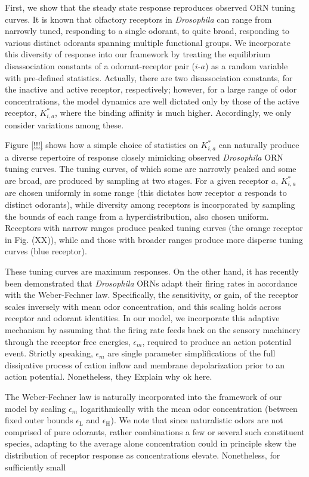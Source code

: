First, we show that the steady state response reproduces observed ORN tuning curves. It is known that olfactory receptors in \textit{Drosophila} can range from narrowly tuned, responding to a single odorant, to quite broad, responding to various distinct odorants spanning multiple functional groups. We incorporate this diversity of response into our framework by treating the equilibrium disassociation constants of a odorant-receptor pair ($i$-$a$) as a random variable with pre-defined statistics. Actually, there are two disassociation constants, for the inactive and active receptor, respectively; however, for a large range of odor concentrations, the model dynamics are well dictated only by those of the active receptor, $K^*_{i, a}$, where the binding affinity is much higher. Accordingly, we only consider variations among these. 

Figure \ref{!!!} shows how a simple choice of statistics on $K^*_{i, a}$ can naturally produce a diverse repertoire of response closely mimicking observed \textit{Drosophila} ORN tuning curves. The tuning curves, of which some are narrowly peaked and some are broad, are produced by sampling at two stages. For a given receptor $a$, $K^*_{i,a}$ are chosen uniformly in some range (this dictates how receptor $a$ responds to distinct odorants), while diversity among receptors is incorporated by sampling the bounds of each range from a hyperdistribution, also chosen uniform. Receptors with narrow ranges produce peaked tuning curves (the orange receptor in Fig. (XX)), while and those with broader ranges produce more disperse tuning curves (blue receptor). 


These tuning curves are maximum responses. On the other hand, it has recently been demonstrated that \textit{Drosophila} ORNs adapt their firing rates in accordance with the Weber-Fechner law. Specifically, the sensitivity, or gain, of the receptor scales inversely with mean odor concentration, and this scaling holds across receptor and odorant identities. In our model, we incorporate this adaptive mechanism by assuming that the firing rate feeds back on the sensory machinery through the receptor free energies, $\epsilon_m$, required to produce an action potential event. Strictly speaking, $\epsilon_m$ are single parameter simplifications of the full dissipative process of cation inflow and membrane depolarization prior to an action potential. Nonetheless, they {\color{blue} Explain why ok here}.  

The Weber-Fechner law is naturally incorporated into the framework of our model by scaling $\epsilon_m$ logarithmically with the mean odor concentration (between fixed outer bounds $\epsilon_{\text {L}}$ and $\epsilon_{\text {H}}$). We note that since naturalistic odors are not comprised of pure odorants, rather combinations a few or several such constituent species, adapting to the average alone concentration could in principle skew the distribution of receptor response as concentrations elevate. Nonetheless, for sufficiently small 


